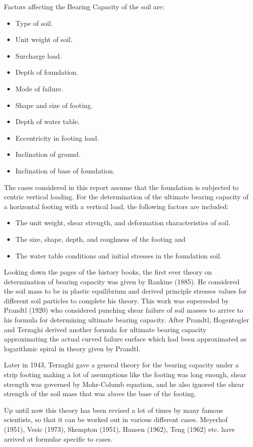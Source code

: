 Factors affecting the Bearing Capacity of the soil are:
\begin{itemize}
\item	Type of soil.
\item	Unit weight of soil.
\item	Surcharge load.
\item	Depth of foundation.
\item	Mode of failure.
\item	Shape and size of footing.
\item	Depth of water table.
\item	Eccentricity in footing load.
\item	Inclination of ground.
\item	Inclination of base of foundation.
\end{itemize}

\par
The cases considered in this report assume that the foundation is subjected to centric vertical loading. For the determination of the ultimate bearing capacity of a horizontal footing with a vertical load, the following factors are included: \cite{dunn_fundamentals_1980}
\begin{itemize}
\item The unit weight, shear strength, and deformation characteristics of soil.
\item The size, shape, depth, and roughness of the footing and
\item The water table conditions and initial stresses in the foundation soil.
\end{itemize}

Looking down the pages of the history books, the first ever theory on determination of bearing capacity was given by Rankine (1885). He considered the soil mass to be in plastic equilibrium and derived principle stresses values for different soil particles to complete his theory. This work was superseded by Prandtl (1920) who considered punching shear failure of soil masses to arrive to his formula for determining ultimate bearing capacity. After Prandtl, Hogentogler and Terzaghi derived another formula for ultimate bearing capacity approximating the actual curved failure surface which had been approximated as logarithmic spiral in theory given by Prandtl.\cite{arora_soil_2004}
\par
Later in 1943, Terzaghi gave a general theory for the bearing capacity under a strip footing making a lot of assumptions like the footing was long enough, shear strength was governed by Mohr-Columb equation, and he also ignored the shear strength of the soil mass that was above the base of the footing.\cite{arora_soil_2004}
\par
Up until now this theory has been revised a lot of times by many famous scientists, so that it can be worked out in various different cases. Meyerhof (1951), Vesic (1973), Skempton (1951), Hansen (1962), Teng (1962) etc. have arrived at formulae specific to cases.\cite{arora_soil_2004}
\par
